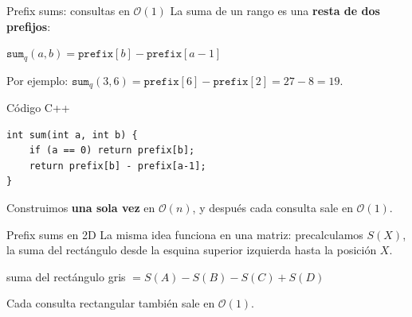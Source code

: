\documentclass{beamer}
\begin{document}
\begin{frame}[fragile]{Prefix sums: consultas en $\mathcal{O}(1)$}
    La suma de un rango es una \textbf{resta de dos prefijos}:
    \begin{center}
        $\texttt{sum}_q(a,b) = \texttt{prefix}[b] - \texttt{prefix}[a-1]$
    \end{center}

    Por ejemplo:
    $\texttt{sum}_q(3,6) = \texttt{prefix}[6] - \texttt{prefix}[2] = 27 - 8 = 19$.

    \begin{block}{Código C++}
    \begin{verbatim}
int sum(int a, int b) {
    if (a == 0) return prefix[b];
    return prefix[b] - prefix[a-1];
}
    \end{verbatim}
    \end{block}

    Construimos \textbf{una sola vez} en $\mathcal{O}(n)$, y después cada
    consulta sale en $\mathcal{O}(1)$.
\end{frame}


\begin{frame}{Prefix sums en 2D}
    La misma idea funciona en una matriz: precalculamos $S(X)$, la suma del
    rectángulo desde la esquina superior izquierda hasta la posición $X$.
    \begin{center}
    \end{center}

    \begin{center}
        suma del rectángulo gris $= S(A) - S(B) - S(C) + S(D)$
    \end{center}

    Cada consulta rectangular también sale en $\mathcal{O}(1)$.
\end{frame}
\end{document}
